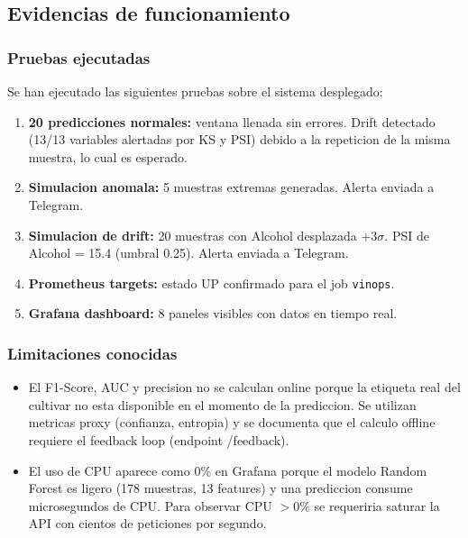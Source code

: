 \subsection{Evidencias de funcionamiento}

\subsubsection{Pruebas ejecutadas}

Se han ejecutado las siguientes pruebas sobre el sistema desplegado:

\begin{enumerate}
    \item \textbf{20 predicciones normales:} ventana llenada sin errores. Drift detectado (13/13 variables alertadas por KS y PSI) debido a la repeticion de la misma muestra, lo cual es esperado.
    \item \textbf{Simulacion anomala:} 5 muestras extremas generadas. Alerta enviada a Telegram.
    \item \textbf{Simulacion de drift:} 20 muestras con Alcohol desplazada $+3\sigma$. PSI de Alcohol = 15.4 (umbral 0.25). Alerta enviada a Telegram.
    \item \textbf{Prometheus targets:} estado UP confirmado para el job \texttt{vinops}.
    \item \textbf{Grafana dashboard:} 8 paneles visibles con datos en tiempo real.
\end{enumerate}

\subsubsection{Limitaciones conocidas}

\begin{itemize}
    \item El F1-Score, AUC y precision no se calculan online porque la etiqueta real del cultivar no esta disponible en el momento de la prediccion. Se utilizan metricas proxy (confianza, entropia) y se documenta que el calculo offline requiere el feedback loop (endpoint /feedback).
    \item El uso de CPU aparece como 0\% en Grafana porque el modelo Random Forest es ligero (178 muestras, 13 features) y una prediccion consume microsegundos de CPU. Para observar CPU $> 0\%$ se requeriria saturar la API con cientos de peticiones por segundo.
\end{itemize}
